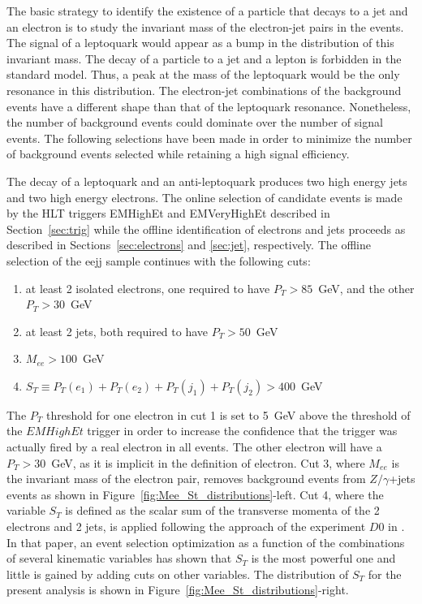 \documentclass[colclass=cmspaper]{combine}
\begin{document}
\begin{linenumbers}

The basic strategy to identify the existence of a particle that decays to a jet and an electron 
is to study the invariant mass of the electron-jet pairs in the events. 
The signal of a leptoquark would appear as a bump in the distribution of this invariant mass.
The decay of a particle to a jet and a lepton is forbidden in the standard model.  
Thus, a peak at the mass of the leptoquark would be the only resonance in this distribution. 
The electron-jet combinations of the background events have a different shape than that 
of the leptoquark resonance. 
Nonetheless, the number of background events could dominate over the number of signal events.  
The following selections have been made in order to minimize the number of background events 
selected while retaining a high signal efficiency.

The decay of a leptoquark and an anti-leptoquark produces two high energy jets and two high energy 
electrons.  
The online selection of candidate events is made by the HLT triggers EMHighEt and EMVeryHighEt 
described in Section~\ref{sec:trig} while the offline identification of electrons and jets 
proceeds as described in Sections~\ref{sec:electrons} and \ref{sec:jet}, respectively.
The offline selection of the eejj sample continues with the following cuts:
%
\begin{enumerate}
\item at least 2 isolated electrons, one required to have $P_T>85$~GeV, 
and the other $P_T>30$~GeV 
\item at least 2 jets, both required to have $P_T>50$~GeV
\item $M_{ee}>100$~GeV
\item $S_T\equiv P_T(e_1)+P_T(e_2)+P_T(j_1)+P_T(j_2)>400$~GeV
\end{enumerate}
%
The $P_T$ threshold for one electron in cut 1 is set to 5~GeV above the threshold of the $EMHighEt$ trigger 
in order to increase the confidence that the trigger was actually fired by a real electron in all events.
The other electron will have a $P_T>30$~GeV, as it is implicit in the definition of electron. 
Cut 3, where $M_{ee}$ is the invariant mass of the electron pair, removes background events from 
$Z/\gamma$+jets events as shown in Figure~\ref{fig:Mee_St_distributions}-left.
Cut 4, where the variable $S_T$ is defined as the scalar sum of the transverse momenta of the 
2 electrons and 2 jets, is applied following the approach of the experiment $D0$ in 
\cite{Abazov:2001mx}. In that paper, an event selection optimization as a function of
the combinations of several kinematic variables has shown that $S_T$ is the most powerful one 
and little is gained by adding cuts on other variables. The distribution of $S_T$ for the present
analysis is shown in Figure~\ref{fig:Mee_St_distributions}-right.


\end{linenumbers}
\end{document}
